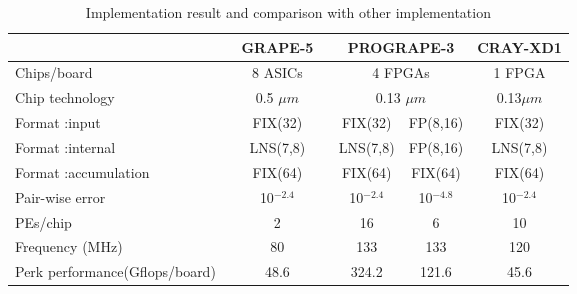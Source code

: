 \documentclass{llncs}
\begin{document}

\begin{table*}
\caption{Implementation result and comparison with other implementation}
\begin{center}
\begin{tabular}{lcccc}
\hline
                     & $~~$ GRAPE-5 $~~$   & \multicolumn{2}{c}{PROGRAPE-3}  & CRAY-XD1\\
\hline
Chips/board          &   8 ASICs      & \multicolumn{2}{c}{ 4 FPGAs}     & 1 FPGA  \\
Chip technology      & 0.5 $\mu m$      & \multicolumn{2}{c}{ 0.13 $\mu m$}  & 0.13$\mu m$ \\
Format :input        & FIX(32)          & FIX(32)   & FP(8,16)               & FIX(32)   \\
Format :internal     & LNS(7,8)         & LNS(7,8)  & FP(8,16)               & LNS(7,8)  \\
Format :accumulation & FIX(64)          & FIX(64)   & FIX(64)                & FIX(64)   \\
Pair-wise error             & 10$^{-2.4}$  &  10$^{-2.4}$ & 10$^{-4.8}$ &  10$^{-2.4}$ \\
PEs/chip             & 2                &   16      &   6                    & 10          \\
Frequency (MHz)      & 80               & 133       &  133                   & 120         \\
Perk performance(Gflops/board)          & 48.6      & 324.2     & 121.6      & 45.6      \\

\hline
\end{tabular}
\end{center}
\label{tabcompg5}
\end{table*}
\end{document}
